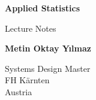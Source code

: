 \begin{titlepage}
	\begin{center}
		\vspace*{1cm}

		\textbf{\Large Applied Statistics}

		\vspace{0.5cm}
		\large Lecture Notes

		\vspace{1.5cm}

		\textbf{Metin Oktay Yılmaz}

		\vfill

		\vspace{0.8cm}


		Systems Design Master\\
		FH K\"arnten\\
		Austria\\
	\end{center}
\end{titlepage}